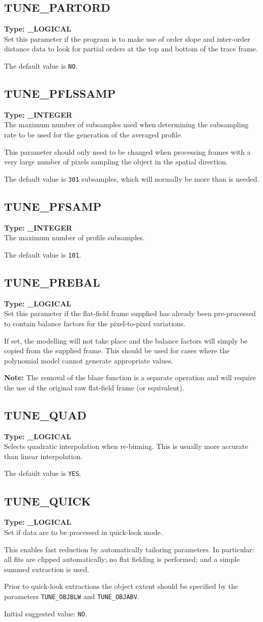 \documentclass[11pt,twoside]{article}
\makeatletter
\newcommand{\htmlref}[2]{#1}
\newcommand{\xlabel}[1]{}
\newcommand{\indexcmdname}[1]{\index{#1@\protect\cmdname{#1}}}
\renewcommand{\indexcmdname}[1]{}
\newcommand{\cmdname}{\begingroup \catcode`\_=12 \realcmdname}
\newcommand{\realcmdname}[1]{\endgroup\texttt{#1}}
\newcommand{\echparameter}[4]
{
\item [#1 = #3] \mbox{}\label{par_#2}\indexcmdname{#2}
\\
#4
}
\renewcommand{\echparameter}[4]
{
  \subsection{\xlabel{par_#2}\label{par_#2}{\bf #1}}
  {\bf Type: #3}\\
#4
}
\makeatother
\begin{document}
\echparameter{TUNE\_PARTORD}{TUNE_PARTORD}{
 \_LOGICAL
}{
 Set this parameter if the program is to make use of order slope and
 inter-order distance data to look for partial orders at the
 top and bottom of the trace frame.

 The default value is \texttt{NO}.
}

\echparameter{TUNE\_PFLSSAMP}{TUNE_PFLSSAMP}{
 \_INTEGER
}{
 The maximum number of subsamples used when determining the
 subsampling rate to be used for the generation of the averaged
 profile.

 This parameter should only need to be changed when processing
 frames with a very large number of pixels sampling the object in
 the spatial direction.

 The default value is \texttt{301} subsamples, which will normally be more
 than is needed.
}

\echparameter{TUNE\_PFSAMP}{TUNE_PFSAMP}{
 \_INTEGER
}{
 The maximum number of profile subsamples.

 The default value is \texttt{101}.
}

\echparameter{TUNE\_PREBAL}{TUNE_PREBAL}{
 \_LOGICAL
}{
 Set this parameter if the flat-field frame supplied has already been
 pre-processed to contain balance factors for the pixel-to-pixel
 variations.

 If set, the modelling will not take
 place and the balance factors will simply be copied from the
 supplied frame.  This should be used for cases where the
 polynomial model cannot generate appropriate values.

 {\bf Note:} The removal of the blaze function is a separate operation and
 will require the use of the original raw flat-field frame (or
 equivalent).
}

\echparameter{TUNE\_QUAD}{TUNE_QUAD}{
 \_LOGICAL
}{
 Selects quadratic interpolation when re-binning.  This is usually
 more accurate than linear interpolation.

 The default value is \texttt{YES}.
}

\echparameter{TUNE\_QUICK}{TUNE_QUICK}{
 \_LOGICAL
}{
 Set if data are to be processed in quick-look mode.

 This enables fast reduction by automatically tailoring parameters.
 In particular: all fits are clipped automatically; no flat fielding
 is performed; and a simple summed extraction is used.

 Prior to quick-look extractions the object extent should be specified
 by the parameters \htmlref{{\tt TUNE\_OBJBLW}}{par_TUNE_OBJBLW} and
 \htmlref{{\tt TUNE\_OBJABV}}{par_TUNE_OBJABV}.

 Initial suggested value: \texttt{NO}.
}
\end{document}
